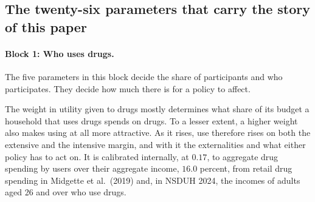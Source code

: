 \documentclass[10pt]{article}
\begin{document}
\subsection{The twenty-six parameters that carry the story of this paper}\label{sec:fmainpar}



\paragraph{Block 1: Who uses drugs.}  The five parameters in this block decide the share of participants and who participates.  They decide how much there is for a policy to affect.
\begin{description}\setlength{\itemsep}{0.25em}\setlength{\parskip}{0em}
\item[$\theta$, the weight on drugs in utility.]
  The weight in utility given to drugs mostly determines what share of its budget a household that uses drugs spends on drugs. To a lesser extent, a higher weight also makes using at all more attractive. As it rises, use therefore rises on both the extensive and the intensive margin, and with it the externalities and what either policy has to act on. It is calibrated internally, at $0.17$, to aggregate drug spending by users over their aggregate income, $16.0$ percent, from retail drug spending in Midgette et al.\ (2019) and, in NSDUH 2024, the incomes of adults aged 26 and over who use drugs.


\end{description}
\end{document}
